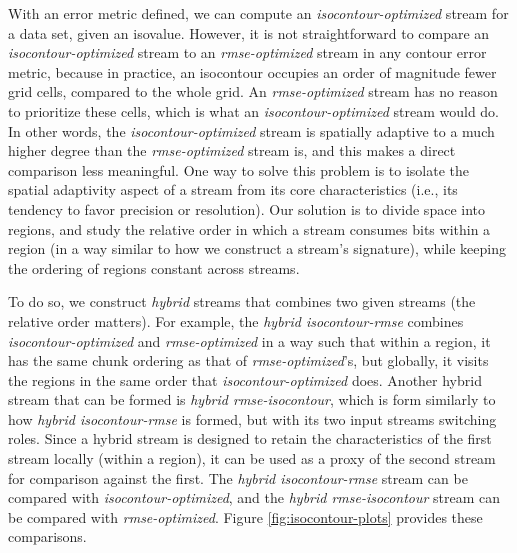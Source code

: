 With an error metric defined, we can compute an \emph{isocontour-optimized} stream for a data set,
given an isovalue. However, it is not straightforward to compare an \emph{isocontour-optimized}
stream to an \emph{rmse-optimized} stream in any contour error metric, because in practice, an
isocontour occupies an order of magnitude fewer grid cells, compared to the whole grid. An
\emph{rmse-optimized} stream has no reason to prioritize these cells, which is what an
\emph{isocontour-optimized} stream would do. In other words, the \emph{isocontour-optimized} stream
is spatially adaptive to a much higher degree than the \emph{rmse-optimized} stream is, and this
makes a direct comparison less meaningful. One way to solve this problem is to isolate the spatial
adaptivity aspect of a stream from its core characteristics (i.e., its tendency to favor precision
or resolution). Our solution is to divide space into regions, and study the relative order in which
a stream consumes bits within a region (in a way similar to how we construct a stream's signature),
while keeping the ordering of regions constant across streams.

To do so, we construct \emph{hybrid} streams that combines two given streams (the relative order
matters). For example, the \emph{hybrid isocontour-rmse} combines \emph{isocontour-optimized} and
\emph{rmse-optimized} in a way such that within a region, it has the same chunk ordering as that of
\emph{rmse-optimized}'s, but globally, it visits the regions in the same order that
\emph{isocontour-optimized} does. Another hybrid stream that can be formed is \emph{hybrid
rmse-isocontour}, which is form similarly to how \emph{hybrid isocontour-rmse} is formed, but with
its two input streams switching roles. Since a hybrid stream is designed to retain the
characteristics of the first stream locally (within a region), it can be used as a proxy of the
second stream for comparison against the first. The \emph{hybrid isocontour-rmse} stream can be
compared with \emph{isocontour-optimized}, and the \emph{hybrid rmse-isocontour} stream can be
compared with \emph{rmse-optimized}. Figure \ref{fig:isocontour-plots} provides these comparisons.

